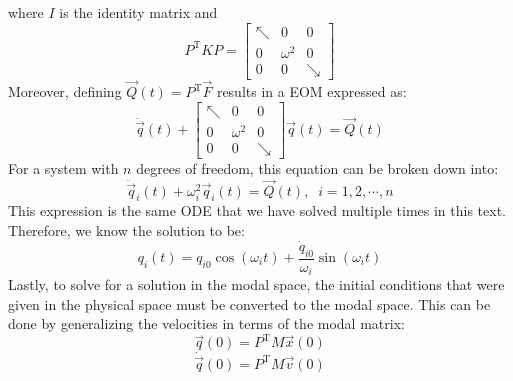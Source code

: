 \documentclass[12pt,letter]{article}
\numberwithin{ex}{section} %
\numberwithin{re}{section} %
\begin{document}
where $I$ is the identity matrix and 
\begin{equation}
P^{\text{T}} K P = \begin{bmatrix} \nwarrow & 0 & 0 \\  0  & \omega^2 & 0 \\  0  & 0 & \searrow \end{bmatrix}
\end{equation}
Moreover, defining $\vec{Q}(t) = P^{\text{T}} \vec{F}$ results in a EOM expressed as:
\begin{equation}
\ddot{\vec{q}}(t) +  \begin{bmatrix} \nwarrow & 0 & 0 \\  0  & \omega^2 & 0 \\  0  & 0 & \searrow \end{bmatrix} \vec{q}(t) = \vec{Q}(t)
\end{equation}
For a system with $n$ degrees of freedom, this equation can be broken down into:
\begin{equation}
\ddot{\vec{q}}_i(t) + \omega_i^2 \vec{q}_i (t) =  \vec{Q}(t), \; \; i=1,2, \cdots, n
\end{equation}
This expression is the same ODE that we have solved multiple times in this text. Therefore, we know the solution to be:
\begin{equation}
q_i(t) = q_{i0} \cos(\omega_i t) +  \frac{\dot{q}_{i0}}{\omega_i} \sin( \omega_i t)
\end{equation}
Lastly, to solve for a solution in the modal space, the initial conditions that were given in the physical space must be converted to the modal space. This can be done by generalizing the velocities in terms of the modal matrix:
\begin{equation}
\vec{q}(0) = P^\text{T} M \vec{x}(0)
\end{equation}
\begin{equation}
\dot{\vec{q}}(0) = P^\text{T} M \vec{v}(0)
\end{equation}
\end{document}
